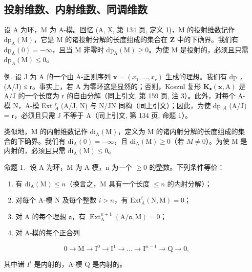 \subsection{投射维数、内射维数、同调维数}

设 A 为环，M 为 A-模。回忆 (A, X, 第 134 页, 定义 1)，M 的投射维数记作 \(\mathrm{dp}_{\mathrm{A}}(\mathrm{M})\)，它是 M 的诸投射分解的长度组成的集合在 \(\overline{\mathbf{Z}}\) 中的下确界。我们有 \(\mathrm{dp}_{\mathrm{A}}(0) = -\infty\)，且当 M 非零时 \(\mathrm{dp}_{\mathrm{A}}(\mathrm{M}) \geqslant 0\)。为使 M 是投射的，必须且只需 \(\mathrm{dp}_{A}(\mathrm{M}) \leqslant 0\)。

例. 设 J 为 A 的一个由 A-正则序列 \(\mathbf{x} = (x_{1}, \ldots, x_{r})\) 生成的理想。我们有 dp \(_{A}\) (A/J) ≤ r。事实上，若 A 为零环这是显然的；否则，Koszul 复形 \(\mathbf{K}_{\bullet}(\mathbf{x}, \mathrm{A})\) 是 A/J 的一个长度为 r 的自由分解（同上引文, 第 159 页, 注 3）。此外，对每个 A-模 N，A-模 Ext \(_{A}^{r}\) (A/J, N) 与 N/JN 同构（同上引文）；因此，为使 dp \(_{A}\) (A/J) = r，必须且只需 J 不等于 A（同上引文, 第 134 页, 命题 1）。

类似地，M 的内射维数记作 \(\mathrm{di}_{\mathrm{A}}(\mathrm{M})\)，定义为 M 的诸内射分解的长度组成的集合的下确界。我们有 \(\mathrm{di}_{\mathrm{A}}(0) = -\infty\)，且 \(\mathrm{di}_{\mathrm{A}}(\mathrm{M}) \geqslant 0\)（若 \(M \neq 0\)）。为使 M 是内射的，必须且只需 \(\mathrm{di}_{\mathrm{A}}(\mathrm{M}) \leqslant 0\)。

命题 1.- 设 A 为环，M 为 A-模，n 为一个 \(\geqslant 0\) 的整数。下列条件等价：

\begin{enumerate}
\def\labelenumi{(\roman{enumi})}
\item
  有 \(\mathrm{di}_{\mathrm{A}}(\mathrm{M}) \leqslant n\)（换言之，M 具有一个长度 \(\leqslant n\) 的内射分解）；
\item
  对每个 A-模 N 及每个整数 \(i > n\)，有 \(\mathrm{Ext}_A^i (\mathrm{N},\mathrm{M}) = 0\)；
\item
  对 A 的每个理想 \(\mathfrak{a}\)，有 \(\operatorname{Ext}_{\mathrm{A}}^{n+1}(\mathrm{A}/\mathfrak{a},\mathrm{M})=0\)；
\item
  对 A-模的每个正合列
\end{enumerate}

\[
0 \rightarrow \mathrm{M} \longrightarrow \mathrm{I} ^ {0} \longrightarrow \mathrm{I} ^ {1} \longrightarrow \dots \longrightarrow \mathrm{I} ^ {n - 1} \longrightarrow \mathrm{Q} \rightarrow 0,
\]

其中诸 \(I^{i}\) 是内射的，A-模 Q 是内射的。


